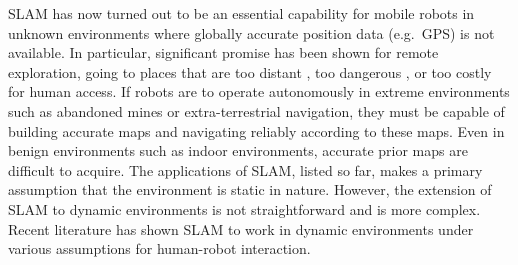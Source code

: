 \acs{SLAM} has now turned out to be an essential capability for mobile robots in unknown environments where globally accurate position data (e.g.\ GPS) is not available. In particular, significant promise has been shown for remote exploration, going to places that are too distant \cite{golombek1997overview}, too dangerous \cite{thrun2003system}, or too costly for human access. If robots are to operate autonomously in extreme environments such as abandoned mines or extra-terrestrial navigation, they must be capable of building accurate maps and navigating reliably according to these maps. Even in benign environments such as indoor environments, accurate prior maps are difficult to acquire. The applications of SLAM, listed so far, makes a primary assumption that the environment is static in nature. However, the extension of SLAM to dynamic environments is not straightforward and is more complex. Recent literature \cite{montemerlo2002conditional} has shown SLAM to work in dynamic environments under various assumptions for human-robot interaction.     

